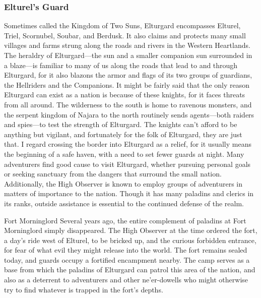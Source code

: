 \documentclass[10pt,a4paper,twoside,twocolumn,openany,bg=print,nodeprecatedcode]{dndbook}
\begin{document}
\subsubsection{Elturel's Guard}
Sometimes called the Kingdom of Two Suns, Elturgard encompasses Elturel, Triel, Scornubel, Soubar, and Berdusk. It also claims and protects many small villages and farms strung along the roads and rivers in the Western Heartlands.
The heraldry of Elturgard—the sun and a smaller companion sun surrounded in a blaze—is familiar to many of us along the roads that lead to and through Elturgard, for it also blazons the armor and flags of its two groups of guardians, the Hellriders and the Companions.
It might be fairly said that the only reason Elturgard can exist as a nation is because of these knights, for it faces threats from all around. The wilderness to the south is home to ravenous monsters, and the serpent kingdom of Najara to the north routinely sends agents—both raiders and spies—to test the strength of Elturgard. The knights can't afford to be anything but vigilant, and fortunately for the folk of Elturgard, they are just that.
I regard crossing the border into Elturgard as a relief, for it usually means the beginning of a safe haven, with a need to set fewer guards at night. Many adventurers find good cause to visit Elturgard, whether pursuing personal goals or seeking sanctuary from the dangers that surround the small nation. Additionally, the High Observer is known to employ groups of adventurers in matters of importance to the nation. Though it has many paladins and clerics in its ranks, outside assistance is essential to the continued defense of the realm.
\begin{DndComment}{Fort Morninglord}
Several years ago, the entire complement of paladins at Fort Morninglord simply disappeared. The High Observer at the time ordered the fort, a day's ride west of Elturel, to be bricked up, and the curious forbidden entrance, for fear of what evil they might release into the world. The fort remains sealed today, and guards occupy a fortified encampment nearby. The camp serves as a base from which the paladins of Elturgard can patrol this area of the nation, and also as a deterrent to adventurers and other ne'er-dowells who might otherwise try to find whatever is trapped in the fort's depths.
\end{DndComment}
\end{document}
